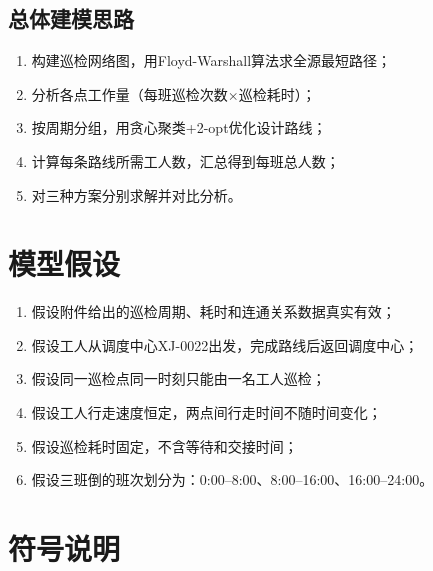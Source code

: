 \documentclass[12pt,a4paper]{article}
\begin{document}
\subsection{总体建模思路}

\begin{enumerate}
    \item 构建巡检网络图，用Floyd-Warshall算法求全源最短路径；
    \item 分析各点工作量（每班巡检次数$\times$巡检耗时）；
    \item 按周期分组，用贪心聚类+2-opt优化设计路线；
    \item 计算每条路线所需工人数，汇总得到每班总人数；
    \item 对三种方案分别求解并对比分析。
\end{enumerate}

\section{模型假设}

\begin{enumerate}
    \item 假设附件给出的巡检周期、耗时和连通关系数据真实有效；
    \item 假设工人从调度中心XJ-0022出发，完成路线后返回调度中心；
    \item 假设同一巡检点同一时刻只能由一名工人巡检；
    \item 假设工人行走速度恒定，两点间行走时间不随时间变化；
    \item 假设巡检耗时固定，不含等待和交接时间；
    \item 假设三班倒的班次划分为：0:00--8:00、8:00--16:00、16:00--24:00。
\end{enumerate}

\section{符号说明}
\end{document}
